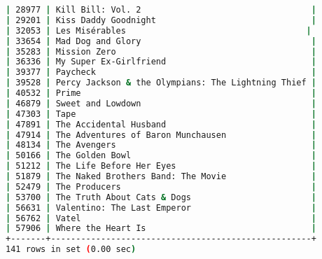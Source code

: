 \begin{lstlisting}[language=bash]
| 28977 | Kill Bill: Vol. 2                                  |
| 29201 | Kiss Daddy Goodnight                               |
| 32053 | Les Misérables                                    |
| 33654 | Mad Dog and Glory                                  |
| 35283 | Mission Zero                                       |
| 36336 | My Super Ex-Girlfriend                             |
| 39377 | Paycheck                                           |
| 39528 | Percy Jackson & the Olympians: The Lightning Thief |
| 40532 | Prime                                              |
| 46879 | Sweet and Lowdown                                  |
| 47303 | Tape                                               |
| 47891 | The Accidental Husband                             |
| 47914 | The Adventures of Baron Munchausen                 |
| 48134 | The Avengers                                       |
| 50166 | The Golden Bowl                                    |
| 51212 | The Life Before Her Eyes                           |
| 51879 | The Naked Brothers Band: The Movie                 |
| 52479 | The Producers                                      |
| 53700 | The Truth About Cats & Dogs                        |
| 56631 | Valentino: The Last Emperor                        |
| 56762 | Vatel                                              |
| 57906 | Where the Heart Is                                 |
+-------+----------------------------------------------------+
141 rows in set (0.00 sec)
\end{lstlisting}

